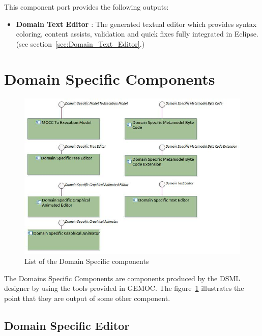 \documentclass{gemoc} %
\begin{document}
This component port provides the following outputs:
\begin{itemize}
  \item \textbf{Domain Text Editor} :
The generated textual editor which provides syntax coloring, content assists, validation and quick fixes fully integrated in Eclipse.
(see section~\ref{sec:Domain_Text_Editor}.)
\end{itemize}

\section{Domain Specific Components}
\begin{figure}[htp]
	\begin{center}
	\includegraphics*[trim=0.0cm 0.0cm 0cm 0.0cm, clip=true, width=1.0\linewidth]{../images/DomainSpecificComponents.jpg}
	\caption{List of the Domain Specific components}
	\label{fig:DomainSpecificComponentList}
	\end{center}
\end{figure}
The Domains Specific Components are components produced by the DSML designer by using the tools provided in GEMOC. The figure~\ref{fig:DomainSpecificComponentList} illustrates the point that they are output of some other component.

\subsection{Domain Specific Editor}
\label{sec:Domain_Specific_Editor}
\end{document}
